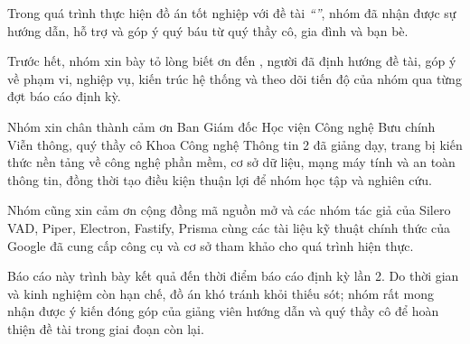 
Trong quá trình thực hiện đồ án tốt nghiệp với đề tài \textit{“\TenDeTai”}, nhóm đã nhận được sự hướng dẫn, hỗ trợ và góp ý quý báu từ quý thầy cô, gia đình và bạn bè.

Trước hết, nhóm xin bày tỏ lòng biết ơn đến \GVHD, người đã định hướng đề tài, góp ý về phạm vi, nghiệp vụ, kiến trúc hệ thống và theo dõi tiến độ của nhóm qua từng đợt báo cáo định kỳ.

Nhóm xin chân thành cảm ơn Ban Giám đốc Học viện Công nghệ Bưu chính Viễn thông, quý thầy cô Khoa Công nghệ Thông tin 2 đã giảng dạy, trang bị kiến thức nền tảng về công nghệ phần mềm, cơ sở dữ liệu, mạng máy tính và an toàn thông tin, đồng thời tạo điều kiện thuận lợi để nhóm học tập và nghiên cứu.

Nhóm cũng xin cảm ơn cộng đồng mã nguồn mở và các nhóm tác giả của Silero VAD, Piper, Electron, Fastify, Prisma cùng các tài liệu kỹ thuật chính thức của Google đã cung cấp công cụ và cơ sở tham khảo cho quá trình hiện thực.

Báo cáo này trình bày kết quả đến thời điểm báo cáo định kỳ lần 2. Do thời gian và kinh nghiệm còn hạn chế, đồ án khó tránh khỏi thiếu sót; nhóm rất mong nhận được ý kiến đóng góp của giảng viên hướng dẫn và quý thầy cô để hoàn thiện đề tài trong giai đoạn còn lại.

\ChuKyNhom
\clearpage
